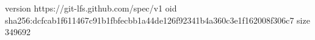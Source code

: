 version https://git-lfs.github.com/spec/v1
oid sha256:dcfcab1f611467c91b1fbfecbb1a44de126f92341b4a360c3e1f162008f306c7
size 349692
